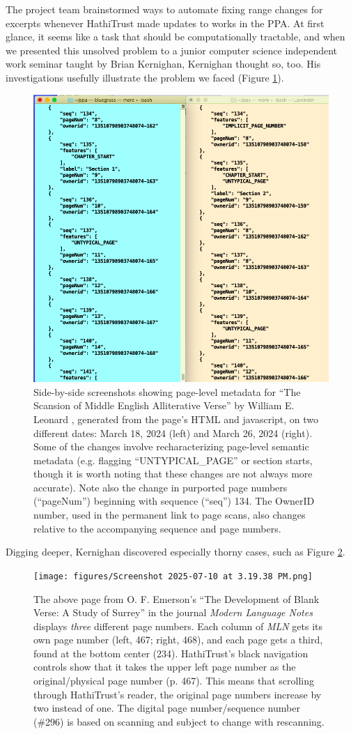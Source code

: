 \documentclass{anthology-ch}         %
\begin{document}
The project team brainstormed ways to automate fixing range changes for excerpts whenever HathiTrust made updates to works in the PPA. At first glance, it seems like a task that should be computationally tractable, and when we presented this unsolved problem to a junior computer science independent work seminar taught by Brian Kernighan, Kernighan thought so, too. His investigations usefully illustrate the problem we faced (Figure  \ref{fig:code-comparison}).

\begin{figure}
    \centering
    \includegraphics[width=0.5\linewidth]{figures/y.png}
    \caption{Side-by-side screenshots showing page-level metadata for “The Scansion of Middle English Alliterative Verse” by William E. Leonard \cite{noauthor_scansion_nodate}, generated from the page’s HTML and javascript, on two different dates: March 18, 2024 (left) and March 26, 2024 (right). Some of the changes involve recharacterizing page-level semantic metadata (e.g. flagging “UNTYPICAL\_PAGE” or section starts, though it is worth noting that these changes are not always more accurate). Note also the change in purported page numbers (“pageNum”) beginning with sequence (“seq”) 134. The OwnerID number, used in the permanent link to page scans, also changes relative to the accompanying sequence and page numbers.}
    \label{fig:code-comparison}
\end{figure}

Digging deeper, Kernighan discovered especially thorny cases, such as Figure \ref{fig:MLN}.

\begin{figure}
    \centering
    \texttt{[image: figures/Screenshot 2025-07-10 at 3.19.38 PM.png]}
    \caption{The above page from O. F. Emerson’s “The Development of Blank Verse: A Study of Surrey” in the journal \textit{Modern Language Notes} \cite{emerson_o_f_development_1889} displays \textit{three} different page numbers. Each column of \textit{MLN }gets its own page number (left, 467; right, 468), and each page gets a third, found at the bottom center (234). HathiTrust’s black navigation controls show that it takes the upper left page number as the original/physical page number (p. 467). This means that scrolling through HathiTrust’s reader, the original page numbers increase by two instead of one. The digital page number/sequence number (\#296) is based on scanning and subject to change with rescanning.}
    \label{fig:MLN}
\end{figure}
\end{document}
